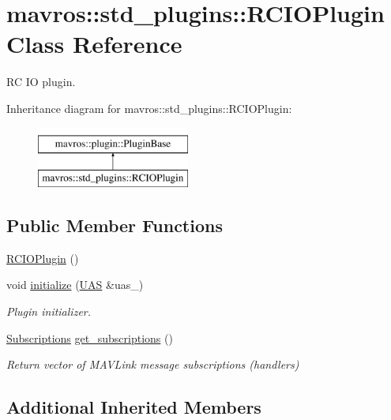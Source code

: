 \hypertarget{classmavros_1_1std__plugins_1_1RCIOPlugin}{}\section{mavros\+::std\+\_\+plugins\+::R\+C\+I\+O\+Plugin Class Reference}
\label{classmavros_1_1std__plugins_1_1RCIOPlugin}


RC IO plugin.  


Inheritance diagram for mavros\+::std\+\_\+plugins\+::R\+C\+I\+O\+Plugin\+:\begin{figure}[H]
\begin{center}
\leavevmode
\includegraphics[height=2.000000cm]{classmavros_1_1std__plugins_1_1RCIOPlugin}
\end{center}
\end{figure}
\subsection*{Public Member Functions}
\begin{DoxyCompactItemize}
\item 
\mbox{\hyperlink{group__plugin_gaabbdf318dd1876ca9ed7c2d09ced9c4e}{R\+C\+I\+O\+Plugin}} ()
\item 
void \mbox{\hyperlink{group__plugin_ga96ac58aa9a228dc59d676fdde7909bf5}{initialize}} (\mbox{\hyperlink{classmavros_1_1UAS}{U\+AS}} \&uas\+\_\+)
\begin{DoxyCompactList}\small\item\em Plugin initializer. \end{DoxyCompactList}\item 
\mbox{\hyperlink{group__plugin_ga8967d61fc77040e0c3ea5a4585d62a09}{Subscriptions}} \mbox{\hyperlink{group__plugin_gafd86a5abaa163c230462ad68151abdff}{get\+\_\+subscriptions}} ()
\begin{DoxyCompactList}\small\item\em Return vector of M\+A\+V\+Link message subscriptions (handlers) \end{DoxyCompactList}\end{DoxyCompactItemize}
\subsection*{Additional Inherited Members}


